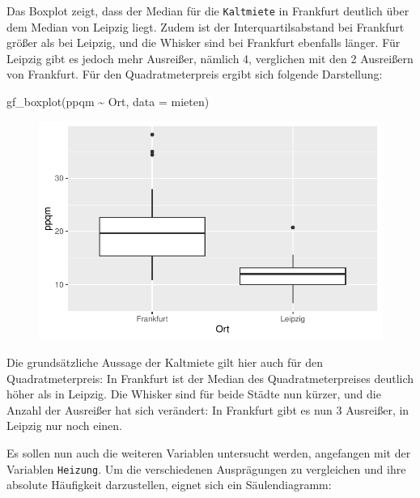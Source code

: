 \documentclass[
  a4paper,
  DIV=11]{scrartcl}
\newenvironment{Shaded}{\begin{snugshade}}{\end{snugshade}}
\newcommand{\AttributeTok}[1]{\textcolor[rgb]{0.40,0.45,0.13}{#1}}
\newcommand{\FunctionTok}[1]{\textcolor[rgb]{0.28,0.35,0.67}{#1}}
\newcommand{\NormalTok}[1]{\textcolor[rgb]{0.00,0.23,0.31}{#1}}
\newcommand{\SpecialCharTok}[1]{\textcolor[rgb]{0.37,0.37,0.37}{#1}}
\begin{document}
Das Boxplot zeigt, dass der Median für die \texttt{Kaltmiete} in
Frankfurt deutlich über dem Median von Leipzig liegt. Zudem ist der
Interquartilsabstand bei Frankfurt größer als bei Leipzig, und die
Whisker sind bei Frankfurt ebenfalls länger. Für Leipzig gibt es jedoch
mehr Ausreißer, nämlich 4, verglichen mit den 2 Ausreißern von
Frankfurt. Für den Quadratmeterpreis ergibt sich folgende Darstellung:

\begin{Shaded}
\begin{Highlighting}[]
\FunctionTok{gf\_boxplot}\NormalTok{(ppqm }\SpecialCharTok{\textasciitilde{}}\NormalTok{ Ort, }\AttributeTok{data =}\NormalTok{ mieten)}
\end{Highlighting}
\end{Shaded}

\begin{figure}[H]

{\centering \includegraphics{Mietmodellierung_files/figure-pdf/unnamed-chunk-11-1.pdf}

}

\end{figure}

Die grundsätzliche Aussage der Kaltmiete gilt hier auch für den
Quadratmeterpreis: In Frankfurt ist der Median des Quadratmeterpreises
deutlich höher als in Leipzig. Die Whisker sind für beide Städte nun
kürzer, und die Anzahl der Ausreißer hat sich verändert: In Frankfurt
gibt es nun 3 Ausreißer, in Leipzig nur noch einen.

Es sollen nun auch die weiteren Variablen untersucht werden, angefangen
mit der Variablen \texttt{Heizung}. Um die verschiedenen Ausprägungen zu
vergleichen und ihre absolute Häufigkeit darzustellen, eignet sich ein
Säulendiagramm:
\end{document}
